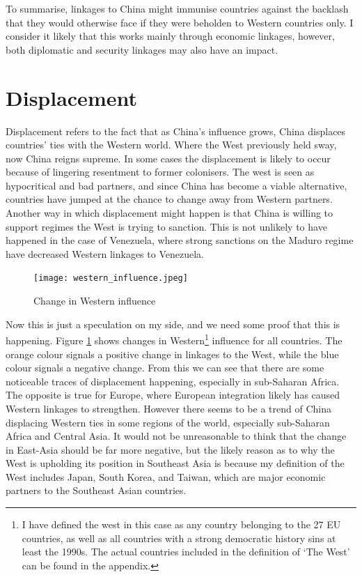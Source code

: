 To summarise, linkages to China might immunise countries against the backlash that they would otherwise face if they were beholden to Western countries only. I consider it likely that this works mainly through economic linkages, however, both diplomatic and security linkages may also have an impact.

\section{Displacement}
Displacement refers to the fact that as China's influence grows, China displaces countries' ties with the Western world. Where the West previously held sway, now China reigns supreme. In some cases the displacement is likely to occur because of lingering resentment to former colonisers. The west is seen as hypocritical and bad partners, and since China has become a viable alternative, countries have jumped at the chance to change away from Western partners. Another way in which displacement might happen is that China is willing to support regimes the West is trying to sanction. This is not unlikely to have happened in the case of Venezuela, where strong sanctions on the Maduro regime have decreased Western linkages to Venezuela.

\begin{figure}[hbt!]
\centering
\texttt{[image: western\_influence.jpeg]}
\caption{Change in Western influence}
\label{fig:west}
\end{figure}

Now this is just a speculation on my side, and we need some proof that this is happening. Figure  \ref{fig:west} shows changes in Western\footnote{I have defined the west in this case as any country belonging to the 27 EU countries, as well as all countries with a strong democratic history sins at least the 1990s. The actual countries included in the definition of `The West' can be found in the appendix.} influence for all countries. The orange colour signals a positive change in linkages to the West, while the blue colour signals a negative change. From this we can see that there are some noticeable traces of displacement happening, especially in sub-Saharan Africa. The opposite is true for Europe, where European integration likely has caused Western linkages to strengthen. However there seems to be a trend of China displacing Western ties in some regions of the world, especially sub-Saharan Africa and Central Asia. It would not be unreasonable to think that the change in East-Asia should be far more negative, but the likely reason as to why the West is upholding its position in Southeast Asia is because my definition of the West includes Japan, South Korea, and Taiwan, which are major economic partners to the Southeast Asian countries. 

